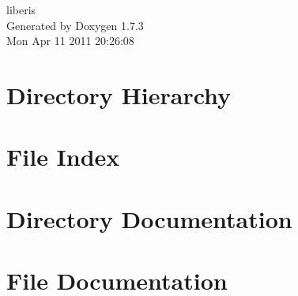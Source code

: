 \documentclass[a4paper]{book}
\begin{document}
\hypersetup{pageanchor=false}
\begin{titlepage}
\vspace*{7cm}
\begin{center}
{\Large liberis }\\
\vspace*{1cm}
{\large Generated by Doxygen 1.7.3}\\
\vspace*{0.5cm}
{\small Mon Apr 11 2011 20:26:08}\\
\end{center}
\end{titlepage}
\clearemptydoublepage
{}
\tableofcontents
\clearemptydoublepage
{}
\hypersetup{pageanchor=true}
\chapter{Directory Hierarchy}

\chapter{File Index}

\chapter{Directory Documentation}



\chapter{File Documentation}











\printindex
\end{document}
